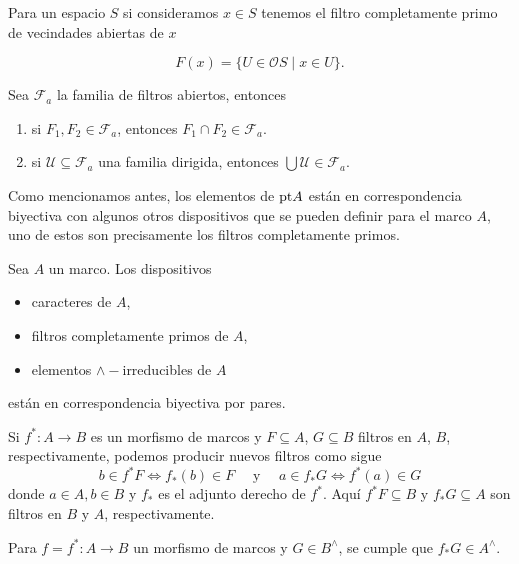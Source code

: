 Para un espacio $S$ si consideramos $x\in S$ tenemos el filtro completamente primo de vecindades abiertas de $x$

\[
F(x)=\{U\in \mathcal{O}S\mid x\in U\}.
\]


\begin{prop}\label{CaracterizacionFabiertos} 
Sea $\mathcal{F}_a$ la familia de filtros abiertos, entonces 
    \begin{enumerate}
        \item si $F_1, F_2\in \mathcal{F}_a$, entonces $F_1\cap F_2 \in \mathcal{F}_a$.
        \item si $\mathcal{U}\subseteq \mathcal{F}_a$ una familia dirigida, entonces $\bigcup \mathcal{U}\in \mathcal{F}_a$.
    \end{enumerate}
\end{prop}

Como mencionamos antes, los elementos de $\mathrm{pt} A$ están en correspondencia biyectiva con algunos otros dispositivos que se pueden definir para el marco $A$, uno de estos son 
precisamente los filtros completamente primos. 

\begin{lem}
    Sea $A$ un marco. Los dispositivos 
    \begin{itemize}
        \item caracteres de $A$,
        \item filtros completamente primos de $A$,
        \item elementos $\wedge-$irreducibles de $A$
    \end{itemize}
    están en correspondencia biyectiva por pares.
\end{lem}

Si $f^*\colon A\to B$ es un morfismo de marcos y $F\subseteq A$, $G\subseteq B$ filtros en $A$, $B$, respectivamente, podemos producir nuevos filtros como sigue
\begin{equation}\label{Imagenfiltros}
b\in f^*F \Leftrightarrow f_*(b)\in F\quad \mbox{ y }\quad a\in f_*G \Leftrightarrow f^*(a)\in G
\end{equation}
donde $a\in A, b\in B$ y $f_*$ es el adjunto derecho de $f^*$. Aquí $f^*F\subseteq B$ y $f_*G\subseteq A$ son filtros en $B$ y $A$, respectivamente.\\

\begin{prop}\label{fF}
    Para $f=f^*\colon A\to B$ un morfismo de marcos y $G\in B^\wedge$, se cumple que $f_*G\in A^\wedge$.
\end{prop}

